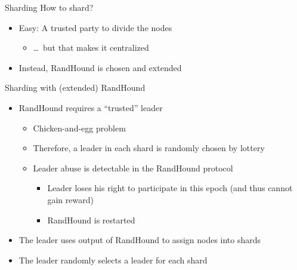 	
	\begin{frame}{Sharding}
		\centering
		How to shard?
		\vspace{.75cm}
		\begin{itemize}
			\item Easy: A trusted party to divide the nodes
			\begin{itemize}
				\item \ldots~but that makes it centralized
			\end{itemize}
			\item Instead, RandHound is chosen and extended
		\end{itemize}
	\end{frame}
	
\begin{frame}{Sharding with (extended) RandHound}
		\begin{itemize}
			\item RandHound requires a ``trusted'' leader
			\begin{itemize}
				\item Chicken-and-egg problem
				\item Therefore, a leader in each shard is randomly chosen by lottery
				\item Leader abuse is detectable in the RandHound protocol
				\begin{itemize}
					\item Leader loses his right to participate in this epoch (and thus cannot gain reward)
					\item RandHound is restarted
				\end{itemize}
			\end{itemize}
			\item The leader uses output of RandHound to assign nodes into shards
			\item The leader randomly selects a leader for each shard
		\end{itemize}
	\end{frame}
	
